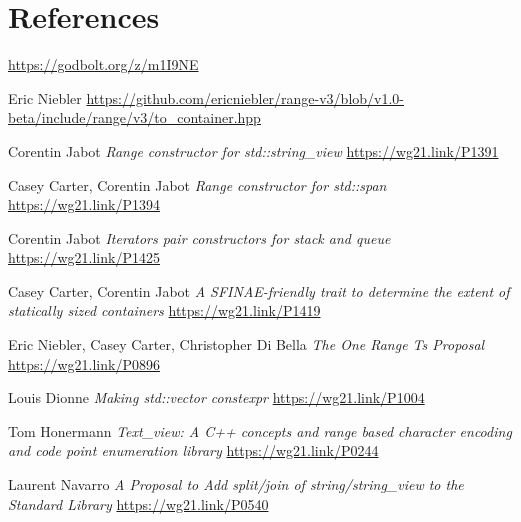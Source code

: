 \documentclass{wg21}
\begin{document}
\section{References}
\renewcommand{\section}[2]{}%
\begin{thebibliography}{9}

	\url{https://godbolt.org/z/m1I9NE}

    Eric Niebler
	\url{https://github.com/ericniebler/range-v3/blob/v1.0-beta/include/range/v3/to_container.hpp}

	Corentin Jabot
	\emph{Range constructor for std::string\_view}\newline
	\url{https://wg21.link/P1391}

	Casey Carter, Corentin Jabot
	\emph{Range constructor for std::span}\newline
	\url{https://wg21.link/P1394}

	Corentin Jabot
	\emph{Iterators pair constructors for stack and queue}\newline
	\url{https://wg21.link/P1425}

	Casey Carter, Corentin Jabot
	\emph{A SFINAE-friendly trait to determine the extent of statically sized containers}\newline
	\url{https://wg21.link/P1419}

    Eric Niebler, Casey Carter, Christopher Di Bella
    \emph{The One Range Ts Proposal}\newline
    \url{https://wg21.link/P0896}

    Louis Dionne
    \emph{Making std::vector constexpr}\newline
    \url{https://wg21.link/P1004}

    Tom Honermann
    \emph{Text_view: A C++ concepts and range based character encoding and code point enumeration library}\newline
    \url{https://wg21.link/P0244}

    Laurent Navarro
    \emph{A Proposal to Add split/join of string/string_view to the Standard Library}\newline
    \url{https://wg21.link/P0540}


\end{thebibliography}
\end{document}
